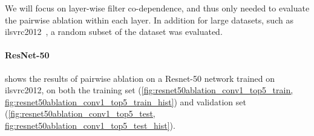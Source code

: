 \documentclass[thesis]{subfiles}
\begin{document}
We will focus on layer-wise filter co-dependence, and thus only needed to evaluate the pairwise ablation within each layer. In addition for large datasets, such as \gls{ilsvrc}2012~\citep{ILSVRC2015}, a random subset of the dataset was evaluated.

\paragraph{ResNet-50}
 shows the results of pairwise ablation on a Resnet-50 \citet{He2015} network trained on \gls{ilsvrc}2012, on both the training set (\cref{fig:resnet50ablation_conv1_top5_train, fig:resnet50ablation_conv1_top5_train_hist}) and validation set (\cref{fig:resnet50ablation_conv1_top5_test, fig:resnet50ablation_conv1_top5_test_hist}).
\end{document}
